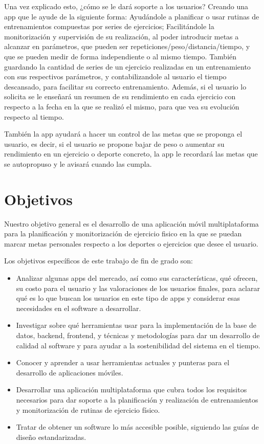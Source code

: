 Una vez explicado esto, ¿cómo se le dará soporte a los usuarios? Creando una app que le ayude de la siguiente forma: Ayudándole a planificar o usar rutinas de entrenamientos compuestas por series de ejercicios; Facilitándole la monitorización y supervisión de su realización, al poder introducir metas a alcanzar en parámetros, que pueden ser repeticiones/peso/distancia/tiempo, y que se pueden medir de forma independiente o al mismo tiempo. También guardando la cantidad de series de un ejercicio realizadas en un entrenamiento con sus respectivos parámetros, y contabilizandole al usuario el tiempo descansado, para facilitar su correcto entrenamiento. Además, si el usuario lo solicita se le enseñará un resumen de su rendimiento en cada ejercicio con respecto a la fecha en la que se realizó el mismo, para que vea su evolución respecto al tiempo. 

También la app ayudará a hacer un control de las metas que se proponga el usuario, es decir, si el usuario se propone bajar de peso o aumentar su rendimiento en un ejercicio o deporte concreto, la app le recordará las metas que se autopropuso y le avisará cuando las cumpla. 

\section{Objetivos}
Nuestro objetivo general es el desarrollo de una aplicación móvil multiplataforma para la planificación y monitorización de ejercicio fisico en la que se puedan marcar metas personales respecto a los deportes o ejercicios que desee el usuario.

Los objetivos específicos de este trabajo de fin de grado son:

\begin{itemize}
	\item Analizar algunas apps del mercado, así como sus características, qué ofrecen, su costo para el usuario y las valoraciones de los usuarios finales, para aclarar qué es lo que buscan los usuarios en este tipo de apps y considerar esas necesidades en el software a desarrollar.
	\item Investigar sobre qué herramientas usar para la implementación de la base de datos, backend, frontend, y técnicas y metodologías para dar un desarrollo de calidad al software y para ayudar a la sostenibilidad del sistema en el tiempo.
	\item Conocer y aprender a usar herramientas actuales y punteras para el desarrollo de aplicaciones móviles. 
	\item Desarrollar una aplicación multiplataforma que cubra todos los requisitos necesarios para dar soporte a la planificación y realización de entrenamientos y monitorización de rutinas de ejercicio físico. 
	\item Tratar de obtener un software lo más accesible posible, siguiendo las guías de diseño estandarizadas.
\end{itemize}

